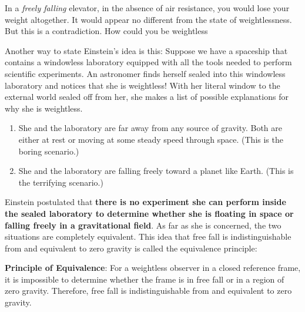 \documentclass{article}
\numberwithin{equation}{section}
\numberwithin{figure}{section}
\begin{document}
In a \textit{freely falling} elevator, in the absence of air resistance, you would lose your weight altogether. It would appear no different from the state of \gls{weightlessness}. But this is a contradiction. How could you be weightless
\vspace{1em}

Another way to state Einstein's idea is this: Suppose we have a spaceship that contains a windowless laboratory equipped with all the tools needed to perform scientific experiments. An astronomer finds herself sealed into this windowless laboratory and notices that she is weightless! With her literal window to the external world sealed off from her, she makes a list of possible explanations for why she is weightless. 

\begin{enumerate}
\setlength\itemsep{0.1ex}
    \item She and the laboratory are far away from any source of gravity. Both are either at rest or moving at some steady speed through space. (This is the boring scenario.)
    \item She and the laboratory are falling freely toward a planet like Earth. (This is the terrifying scenario.)
\end{enumerate}

Einstein postulated that \textbf{there is no experiment she can perform inside the sealed laboratory to determine whether she is floating in space or falling freely in a gravitational field}. As far as she is concerned, the two situations are completely equivalent. This idea that free fall is indistinguishable from and equivalent to zero gravity is called the equivalence principle:

\begin{mdframed}[backgroundcolor=black!10]
\textbf{Principle of Equivalence}: 
For a weightless observer in a closed reference frame, it is impossible to determine whether the frame is in free fall or in a region of zero gravity. Therefore, free fall is indistinguishable from and equivalent to zero gravity.

\end{mdframed}
\end{document}
